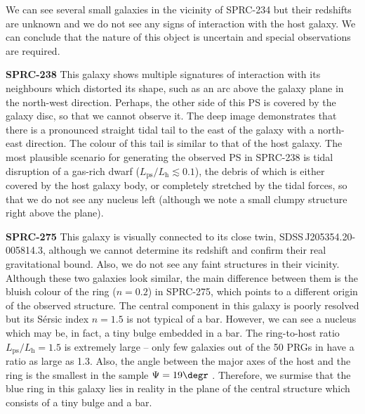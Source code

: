 \documentclass{raa}
\begin{document}
We can see several small galaxies in the vicinity of SPRC-234 but their redshifts are unknown and we do not see any signs of interaction with the host galaxy. We can conclude that the nature of this object is uncertain and special observations are required.



{\bf SPRC-238} 
This galaxy shows multiple signatures of interaction with its neighbours which distorted its shape, such as an arc above the galaxy plane in the north-west direction. Perhaps, the other side of this PS is covered by the galaxy disc, so that we cannot observe it. The deep image demonstrates that there is a pronounced straight tidal tail to the east of the galaxy with a north-east direction. The colour of this tail is similar to that of the host galaxy. 
The most plausible scenario for generating the observed PS in SPRC-238 is tidal disruption of a gas-rich dwarf ($L_\mathrm{ps}/L_\mathrm{h}\lesssim0.1$), the debris of which is either covered by the host galaxy body, or completely stretched by the tidal forces, so that we do not see any nucleus left (although we note a small clumpy structure right above the plane).



{\bf SPRC-275}
This galaxy is visually connected to its close twin, SDSS\,J205354.20-005814.3, although we cannot determine its redshift and confirm their real gravitational bound. Also, we do not see any faint structures in their vicinity. Although these two galaxies look similar, the main difference between them is the bluish colour of the ring ($n=0.2$) in SPRC-275, which points to a different origin of the observed structure. The central component in this galaxy is poorly resolved but its S\'ersic index $n=1.5$ is not typical of a bar. However, we can see a nucleus which may be, in fact, a tiny bulge embedded in a bar. The ring-to-host ratio $L_\mathrm{ps}/L_\mathrm{h}=1.5$ is extremely large -- only few galaxies out of the 50 PRGs in \citet{rc2015} have a ratio as large as 1.3. Also, the angle between the major axes of the host and the ring is the smallest in the sample $\Psi=19\degr$ \citep[see also][]{2013AstBu..68..371S}. Therefore, we surmise that the blue ring in this galaxy lies in reality in the plane of the central structure which consists of a tiny bulge and a bar.
\end{document}
